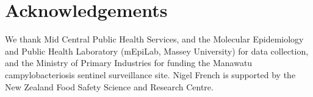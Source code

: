 \documentclass[AMA,STIX1COL]{WileyNJD-v2}
\begin{document}
\section*{Acknowledgements}

We thank Mid Central Public Health Services, and the Molecular Epidemiology and Public Health Laboratory (mEpiLab, Massey University) for data collection, and the Ministry of Primary Industries for funding the Manawatu campylobacteriosis sentinel surveillance site. Nigel French is supported by the New Zealand Food Safety Science and Research Centre.


\end{document}
